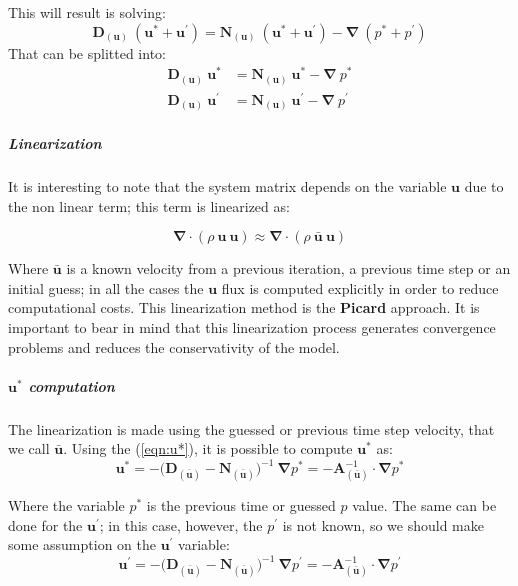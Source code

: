 \noindent This will result is solving:
\begin{equation}
    \boldsymbol{D}_{(\boldsymbol{u})} \ (\boldsymbol{u}^* + \boldsymbol{u}^{\prime}) = \boldsymbol{N}_{(\boldsymbol{u})} \ (\boldsymbol{u}^* + \boldsymbol{u}^{\prime}) - \boldsymbol{\nabla} \ (p^* + p^{\prime})  
\end{equation}
\noindent That can be splitted into:
\begin{align}
    \boldsymbol{D}_{(\boldsymbol{u})} \ \boldsymbol{u}^*        & = \boldsymbol{N}_{(\boldsymbol{u})} \ \boldsymbol{u}^* - \boldsymbol{\nabla} \ p^* \label{eqn:u*} \\
    \boldsymbol{D}_{(\boldsymbol{u})} \ \boldsymbol{u}^{\prime} & = \boldsymbol{N}_{(\boldsymbol{u})} \ \boldsymbol{u}^{\prime} - \boldsymbol{\nabla} \ p^{\prime} \label{eqn:up}  
\end{align}

\subparagraph{Linearization}
It is interesting to note that the system matrix depends on the variable $\boldsymbol{u}$ due to the non linear term; this term is linearized as: 

\begin{equation}
    \boldsymbol{\nabla} \cdot (\rho \ \boldsymbol{u} \ \boldsymbol{u}) \approx \boldsymbol{\nabla} \cdot (\rho \ \bar{\boldsymbol{u}} \ \boldsymbol{u})
    \label{eqn:PICARD}
\end{equation}

\noindent Where $\bar{\boldsymbol{u}}$ is a known velocity from a previous iteration, a previous time step or an initial guess; in all the cases the $\boldsymbol{u}$ flux is computed explicitly in order to reduce computational costs. This linearization method is the \textbf{Picard} approach. It is important to bear in mind that this linearization process generates convergence problems and reduces the conservativity of the model. 

\subparagraph{$\boldsymbol{u}^*$ computation} The linearization is made using the guessed or previous time step velocity, that we call $\bar{\boldsymbol{u}}$. Using the (\ref{eqn:u*}), it is possible to compute $\boldsymbol{u}^*$ as:
\begin{equation}
    \boldsymbol{u}^* = - \big( \boldsymbol{D}_{(\bar{\boldsymbol{u}})} - \boldsymbol{N}_{(\bar{\boldsymbol{u}})} \big)^{-1} \ \boldsymbol{\nabla} p^* = - \boldsymbol{A}_{(\bar{\boldsymbol{u}})}^{-1} \cdot \boldsymbol{\nabla} p^*
    \label{eqn:predictor}
\end{equation}

\noindent Where the variable $p^*$ is the previous time or guessed $p$ value. The same can be done for the $\boldsymbol{u}^{\prime}$; in this case, however, the $p^{\prime}$ is not known, so we should make some assumption on the $\boldsymbol{u}^{\prime}$ variable:
\begin{equation}
    \boldsymbol{u}^{\prime} = - \big( \boldsymbol{D}_{(\bar{\boldsymbol{u}})} - \boldsymbol{N}_{(\bar{\boldsymbol{u}})} \big)^{-1} \ \boldsymbol{\nabla} p^{\prime} = - \boldsymbol{A}_{(\bar{\boldsymbol{u}})}^{-1} \cdot \boldsymbol{\nabla} p^{\prime}
    \label{eqn:up1}
\end{equation}

